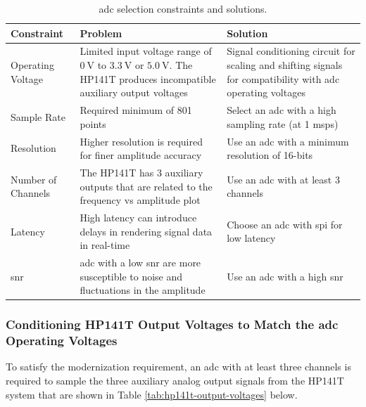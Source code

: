 \documentclass[class=report,11pt,crop=false]{standalone}
\begin{document}
	\begin{table}[!ht]
		\centering
		\begin{tabular}{|m{8em}|m{15em}|m{15em}|}
			\hline
			\cellcolor{cyan!25}\textbf{Constraint}	& \cellcolor{cyan!25}\textbf{Problem}	& \cellcolor{cyan!25}\textbf{Solution}\\
			\hline
			Operating Voltage	& Limited input voltage range of $\SI{0}{\volt}$ to $\SI{3.3}{\volt}$ or $\SI{5.0}{\volt}$. The HP141T produces incompatible auxiliary output voltages	& Signal conditioning circuit for scaling and shifting signals for compatibility with \acrshort{adc} operating voltages\\
			\hline
			Sample Rate			& Required minimum of 801 points & Select an \acrshort{adc} with a high sampling rate (at 1 \acrshort{msps}) \\
			\hline
			Resolution			& Higher resolution is required for finer amplitude accuracy	& Use an \acrshort{adc} with a minimum resolution of 16-bits\\
			\hline
			Number of Channels	& The HP141T has 3 auxiliary outputs that are related to the frequency vs amplitude plot 	& Use an \acrshort{adc} with at least 3 channels\\
			\hline
			Latency				& High latency can introduce delays in rendering signal data in real-time	& Choose an \acrshort{adc} with \acrshort{spi} for low latency\\
			\hline
			\acrshort{snr}	& \acrshort{adc} with a low \acrshort{snr} are more susceptible to noise and fluctuations in the amplitude 	&	Use an \acrshort{adc} with a high \acrshort{snr}\\
			\hline
		\end{tabular}
		\label{tab:adc-constraints}
		\caption{\acrshort{adc} selection constraints and solutions.}
	\end{table}

	\subsubsection{Conditioning HP141T Output Voltages to Match the \acrshort{adc} Operating Voltages}
	
	To satisfy the modernization requirement, an \acrshort{adc} with at least three channels is required to sample the three auxiliary analog output signals from the HP141T system that are shown in Table \ref{tab:hp141t-output-voltages} below.
	
\end{document}
